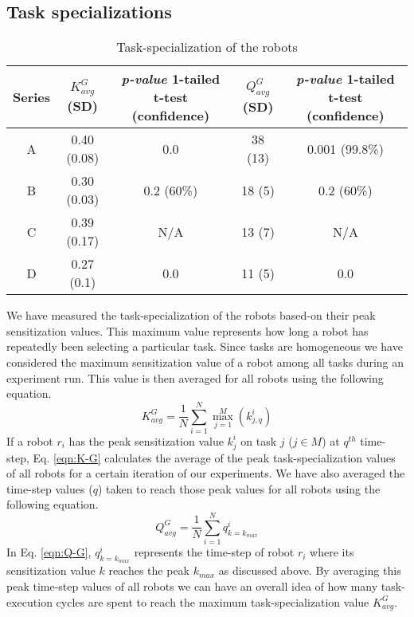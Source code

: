 \documentclass[journal]{IEEEtran}
\begin{document}
\subsection{Task specializations}
\vspace*{-0.2cm}
\begin{table*}[h!]
\vspace*{-0.6cm}
\begin{small}
\begin{center}
\caption{Task-specialization of the robots}
\begin{tabular}{|c|c|c|c|c|}
\hline  Series & $ K^G_{avg}$ (SD) & \textit{ p-value} 1-tailed  t-test (confidence)  & $ Q^G_{avg}$  (SD) & \textit{ p-value}  1-tailed  t-test  (confidence) \\ 
\hline A & 0.40 (0.08)& 0.0 & 38 (13) & 0.001 (99.8\%)\\ 
\hline B &  0.30 (0.03) & 0.2 (60\%) &  18 (5) & 0.2 (60\%)\\
\hline C  & 0.39 (0.17) & N/A & 13 (7) & N/A \\
\hline D  & 0.27 (0.1)& 0.0 & 11 (5) & 0.0\\
\hline
\end{tabular}
\label{table:k-cmp} 
\end{center}
\end{small}
\vspace*{-0.3cm}
\end{table*}
We have measured the task-specialization of the robots based-on their peak sensitization values. This maximum value represents how long a robot has repeatedly been selecting a particular task. Since tasks are homogeneous we have considered the maximum sensitization value of a robot among all tasks during an experiment run. This value is then averaged for all robots using the following  equation. 
\begin{equation}
K^G_{avg} = \frac{1}{N}\sum_{i=1}^{N} \max_{j=1}^M\left ( k^i_{j, q} \right ) 
\label{eqn:K-G}
\end{equation}
If a robot $r_i$ has the peak sensitization value $k^i_j$ on task $j$ ($j \in M$)  at $q^{th}$ time-step, Eq. \ref{eqn:K-G} calculates the average of the peak task-specialization values of all robots for a certain iteration of our experiments. We have also averaged the time-step values ($q$) taken to reach those peak values for all robots using the following equation.
\begin{equation}
Q^G_{avg}= \frac{1}{N}\sum_{i=1}^{N} q^i_{k=k_{max}}
\label{eqn:Q-G}
\end{equation}
In Eq. \ref{eqn:Q-G}, $q^i_{k=k_{max}}$ represents the time-step of robot $r_i$  where its sensitization value $k$ reaches the peak $k_{max}$ as discussed above. By averaging this peak time-step values of all robots we can have an overall idea of how many task-execution cycles are spent to reach the maximum task-specialization value $K^G_{avg}$.
\end{document}
